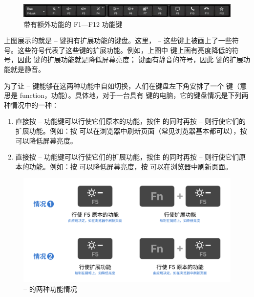 \begin{figure}[htb!]
  \centering
  \includegraphics[width=.9\textwidth]{assets/basic/F1_to_F12_keys_with_extra_functions.png}
  \caption{带有额外功能的 F1—F12 功能键}
  \label{fig:F1_to_F12_keys_with_extra_functions}
\end{figure}

上图展示的就是  --  键拥有扩展功能的键盘。这里， --  这些键上被画上了一些符号。这些符号代表了这些键的扩展功能。例如，上图中  键上画有亮度降低的符号，因此  键的扩展功能就是降低屏幕亮度；  键画有静音的符号，因此  键的扩展功能就是静音。

为了让  --  键能够在这两种功能中自如切换，人们在键盘左下角安排了一个  键（意思是 function，功能）。具体地，对于一台具有  键的电脑，它的键盘情况是下列两种情况中的一种：

\begin{enumerate}
  \item 直接按  --  功能键可以行使它们原本的功能，按住  的同时再按  --  则行使它们的扩展功能。例如：按  可以在浏览器中刷新页面（常见浏览器基本都可以），按  可以降低屏幕亮度。
  \item 直接按  --  功能键可以行使它们的扩展功能，按住  的同时再按  --  则行使它们原本的功能。例如：按  可以降低屏幕亮度，按  可以在浏览器中刷新页面。
\end{enumerate}

\begin{figure}[htb!]
  \centering
  \includegraphics[width=.8\textwidth]{assets/basic/Fn_functions.pdf}
  \caption{ --  的两种功能情况}
  \label{fig:Fn_functions}
\end{figure}

